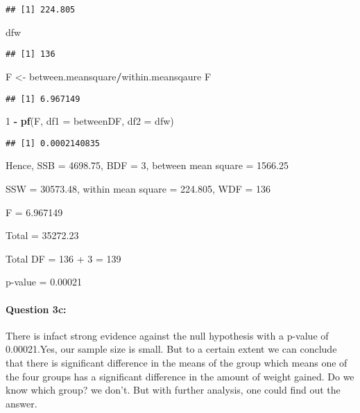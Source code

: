 \documentclass[
]{article}
\newenvironment{Shaded}{\begin{snugshade}}{\end{snugshade}}
\newcommand{\AttributeTok}[1]{\textcolor[rgb]{0.13,0.29,0.53}{#1}}
\newcommand{\DecValTok}[1]{\textcolor[rgb]{0.00,0.00,0.81}{#1}}
\newcommand{\FunctionTok}[1]{\textcolor[rgb]{0.13,0.29,0.53}{\textbf{#1}}}
\newcommand{\NormalTok}[1]{#1}
\newcommand{\OtherTok}[1]{\textcolor[rgb]{0.56,0.35,0.01}{#1}}
\newcommand{\SpecialCharTok}[1]{\textcolor[rgb]{0.81,0.36,0.00}{\textbf{#1}}}
\begin{document}
\begin{verbatim}
## [1] 224.805
\end{verbatim}

\begin{Shaded}
\begin{Highlighting}[]
\NormalTok{dfw}
\end{Highlighting}
\end{Shaded}

\begin{verbatim}
## [1] 136
\end{verbatim}

\begin{Shaded}
\begin{Highlighting}[]
\NormalTok{F }\OtherTok{\textless{}{-}}\NormalTok{ between.meansquare}\SpecialCharTok{/}\NormalTok{within.meansqaure}
\NormalTok{F}
\end{Highlighting}
\end{Shaded}

\begin{verbatim}
## [1] 6.967149
\end{verbatim}

\begin{Shaded}
\begin{Highlighting}[]
\DecValTok{1} \SpecialCharTok{{-}} \FunctionTok{pf}\NormalTok{(F, }\AttributeTok{df1 =}\NormalTok{ betweenDF, }\AttributeTok{df2 =}\NormalTok{ dfw)}
\end{Highlighting}
\end{Shaded}

\begin{verbatim}
## [1] 0.0002140835
\end{verbatim}

Hence, SSB = 4698.75, BDF = 3, between mean square = 1566.25

SSW = 30573.48, within mean square = 224.805, WDF = 136

F = 6.967149

Total = 35272.23

Total DF = 136 + 3 = 139

p-value = 0.00021

\hypertarget{question-3c}{%
\paragraph{Question 3c:}\label{question-3c}}

There is infact strong evidence against the null hypothesis with a
p-value of 0.00021.Yes, our sample size is small. But to a certain
extent we can conclude that there is significant difference in the means
of the group which means one of the four groups has a significant
difference in the amount of weight gained. Do we know which group? we
don't. But with further analysis, one could find out the answer.
\end{document}
